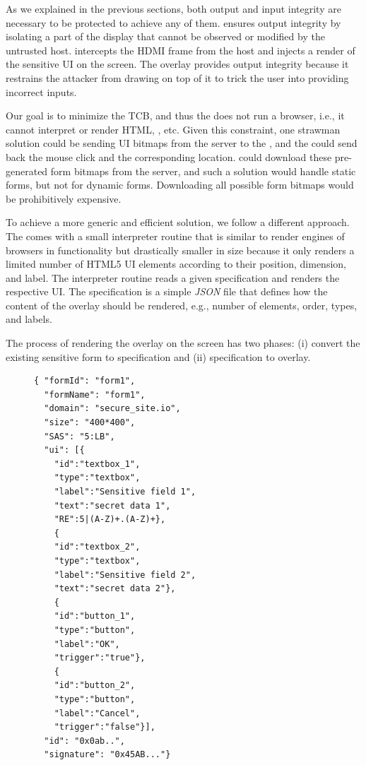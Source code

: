 As we explained in the previous sections, both output and input integrity are necessary to be protected to achieve any of them. \name ensures output integrity by isolating a part of the display that cannot be observed or modified by the untrusted host. \device intercepts the HDMI frame from the host and injects a render of the sensitive UI on the screen. The overlay provides output integrity because it restrains the attacker from drawing on top of it to trick the user into providing incorrect inputs. 

Our goal is to minimize the TCB, and thus the \device does not run a browser, i.e., it cannot interpret or render HTML, \js, etc. Given this constraint, one strawman solution could be sending UI bitmaps from the server to the \device, and the \device could send back the mouse click and the corresponding location. \device could download these pre-generated form bitmaps from the server, and such a solution would handle static forms, but not for dynamic forms. Downloading all possible form bitmaps would be prohibitively expensive.

To achieve a more generic and efficient solution, we follow a different approach. The \device comes with a small interpreter routine that is similar to render engines of browsers in functionality but drastically smaller in size because it only renders a limited number of HTML5 UI elements according to their position, dimension, and label. The interpreter routine reads a given specification and renders the respective UI. The specification is a simple \emph{JSON} file that defines how the content of the overlay should be rendered, e.g., number of elements, order, types, and labels.  

The process of rendering the overlay on the screen has two phases: (i) convert the existing sensitive form to specification and (ii) specification to overlay.



\begin{figure}[t]
\begin{lstlisting}[mathescape=true]
{ "formId": "form1", 
  "formName": "form1",
  "domain": "secure_site.io",
  "size": "400*400", 
  "SAS": "5:LB",
  "ui": [{
	"id":"textbox_1",
	"type":"textbox", 
	"label":"Sensitive field 1",
	"text":"secret data 1",
	"RE":5|(A-Z)+.(A-Z)+},
	{
	"id":"textbox_2",
	"type":"textbox",
	"label":"Sensitive field 2",
	"text":"secret data 2"},
	{
	"id":"button_1",
	"type":"button",
	"label":"OK",
	"trigger":"true"},    
	{
	"id":"button_2",
	"type":"button",
	"label":"Cancel",
	"trigger":"false"}],
  "id": "0x0ab..",
  "signature": "0x45AB..."}
\end{lstlisting}

\end{figure}



